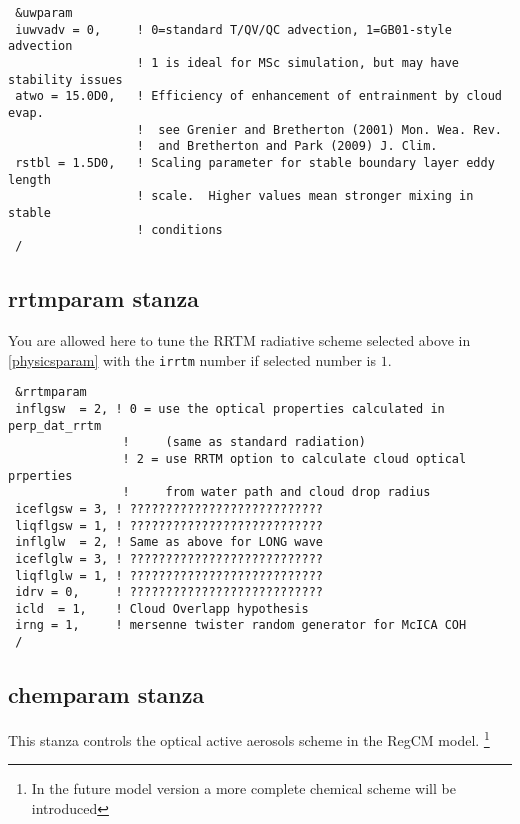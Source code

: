 {\footnotesize
\begin{Verbatim}
 &uwparam
 iuwvadv = 0,     ! 0=standard T/QV/QC advection, 1=GB01-style advection
                  ! 1 is ideal for MSc simulation, but may have stability issues
 atwo = 15.0D0,   ! Efficiency of enhancement of entrainment by cloud evap.
                  !  see Grenier and Bretherton (2001) Mon. Wea. Rev.
                  !  and Bretherton and Park (2009) J. Clim.
 rstbl = 1.5D0,   ! Scaling parameter for stable boundary layer eddy length
                  ! scale.  Higher values mean stronger mixing in stable 
                  ! conditions
 /
\end{Verbatim}
}

\subsection{rrtmparam stanza}

You are allowed here to tune the RRTM radiative scheme selected above in
\ref{physicsparam} with the \verb=irrtm= number if selected number is $1$. 

{\footnotesize
\begin{Verbatim}
 &rrtmparam
 inflgsw  = 2, ! 0 = use the optical properties calculated in perp_dat_rrtm
                !     (same as standard radiation)
                ! 2 = use RRTM option to calculate cloud optical prperties
                !     from water path and cloud drop radius
 iceflgsw = 3, ! ???????????????????????????
 liqflgsw = 1, ! ???????????????????????????
 inflglw  = 2, ! Same as above for LONG wave
 iceflglw = 3, ! ???????????????????????????
 liqflglw = 1, ! ???????????????????????????
 idrv = 0,     ! ???????????????????????????
 icld  = 1,    ! Cloud Overlapp hypothesis
 irng = 1,     ! mersenne twister random generator for McICA COH
 /
\end{Verbatim}
}

\subsection{chemparam stanza}

This stanza controls the optical active aerosols scheme in the RegCM model.
\footnote{In the future model version a more complete chemical scheme will
be introduced} 

